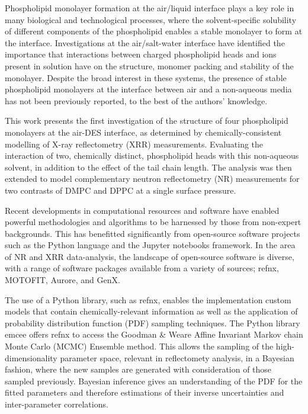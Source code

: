 \documentclass[%
 reprint,
 amsmath,amssymb,
 prl,
]{revtex4-1}
\begin{document}
Phospholipid monolayer formation at the air/liquid interface plays a key role in many biological and technological processes, where the solvent-specific solubility of different components of the phospholipid enables a stable monolayer to form at the interface\cite{Mohwald1990}.
Investigations at the air/salt-water interface have identified the importance that interactions between charged phospholipid heads and ions present in solution have on the structure, monomer packing and stability of the monolayer\cite{Mohwald1990,Kewalramani2010}.
Despite the broad interest in these systems, the presence of stable phospholipid monolayers at the interface between air and a non-aqueous media has not been previously reported, to the best of the authors' knowledge.

This work presents the first investigation of the structure of four phospholipid monolayers at the air-DES interface, as determined by chemically-consistent modelling of X-ray reflectometry (XRR) measurements.
Evaluating the interaction of two, chemically distinct, phospholipid heads with this non-aqueous solvent, in addition to the effect of the tail chain length. The analysis was then extended to model complementary neutron reflectometry (NR) measurements for two contrasts of DMPC and DPPC at a single surface pressure.

Recent developments in computational resources and software have enabled powerful methodologies and algorithms to be harnessed by those from non-expert backgrounds.
This has benefitted significantly from open-source software projects such as the Python language\cite{vanRossum1995} and the Jupyter notebooks framework\cite{Kluyver2016}.
In the area of NR and XRR data-analysis, the landscape of open-source software is diverse, with a range of software packages available from a variety of sources; refnx\cite{Nelson2018}, MOTOFIT\cite{Nelson2006}, Aurore\cite{Gerelli2016}, and GenX\cite{Bjorck2007}.

The use of a Python library, such as refnx, enables the implementation custom models that contain chemically-relevant information as well as the application of probability distribution function (PDF) sampling techniques.
The Python library emcee\cite{Foreman-Mackey2013} offers refnx to access the Goodman \& Weare Affine Invariant Markov chain Monte Carlo (MCMC) Ensemble method\cite{Goodman2010}.
This allows the sampling of the high-dimensionality parameter space, relevant in reflectomety analysis, in a Bayesian fashion, where the new samples are generated with consideration of those sampled previously\cite{Sivia2006}.
Bayesian inference gives an understanding of the PDF for the fitted parameters and therefore estimations of their inverse uncertainties and inter-parameter correlations.
\end{document}

